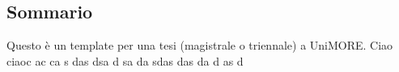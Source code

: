 \thispagestyle{plain}

\begin{otherlanguage}{italian}
\section*{Sommario}
Questo è un template per una tesi (magistrale o triennale) a UniMORE. Ciao ciaoc ac ca s das dsa d sa da sdas das da d as d 
\newpage
\end{otherlanguage}